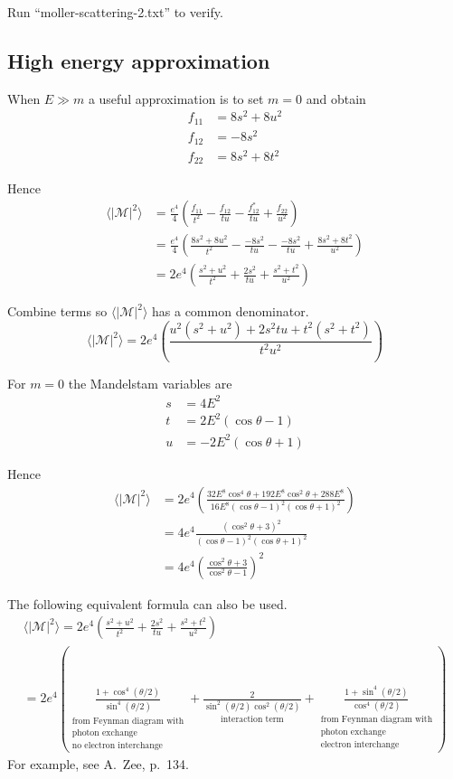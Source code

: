\documentclass[12pt]{article}
\begin{document}
\noindent
Run ``moller-scattering-2.txt'' to verify.

\subsection*{High energy approximation}
When $E\gg m$ a useful approximation is to set $m=0$ and obtain
\begin{align*}
f_{11}&=8s^2+8u^2\\
f_{12}&=-8s^2\\
f_{22}&=8s^2+8t^2
\end{align*}

\noindent
Hence
\begin{align*}
\langle|\mathcal{M}|^2\rangle
&=\frac{e^4}{4}
\left(
\frac{f_{11}}{t^2}-\frac{f_{12}}{tu}-\frac{f_{12}^*}{tu}+\frac{f_{22}}{u^2}
\right)
\\
&=\frac{e^4}{4}
\left(
\frac{8s^2+8u^2}{t^2}-\frac{-8s^2}{tu}-\frac{-8s^2}{tu}+\frac{8s^2+8t^2}{u^2}
\right)
\\
&=2e^4
\left(
\frac{s^2+u^2}{t^2}+\frac{2s^2}{tu}+\frac{s^2+t^2}{u^2}
\right)
\end{align*}

\noindent
Combine terms so $\langle|\mathcal{M}|^2\rangle$ has a common denominator.
\begin{equation*}
\langle|\mathcal{M}|^2\rangle
=2e^4
\left(
\frac{u^2(s^2+u^2)+2s^2tu+t^2(s^2+t^2)}{t^2u^2}
\right)
\end{equation*}

\noindent
For $m=0$ the Mandelstam variables are
\begin{align*}
s&=4E^2
\\
t&=2E^2(\cos\theta-1)
\\
u&=-2E^2(\cos\theta+1)
\end{align*}

\noindent
Hence
\begin{align*}
\langle|\mathcal{M}|^2\rangle
&=2e^4
\left(
\frac{32E^8\cos^4\theta+192E^8\cos^2\theta+288E^8}{16E^8(\cos\theta-1)^2(\cos\theta+1)^2}
\right)
\\
&=4e^4\frac{\left(\cos^2\theta+3\right)^2}{(\cos\theta-1)^2(\cos\theta+1)^2}
\\
&=4e^4
\left(
\frac{\cos^2\theta+3}{\cos^2\theta-1}
\right)^2
\end{align*}

\noindent
The following equivalent formula can also be used.
\begin{multline*}
\langle|\mathcal{M}|^2\rangle
=2e^4
\left(
\frac{s^2+u^2}{t^2}+\frac{2s^2}{tu}+\frac{s^2+t^2}{u^2}
\right)
\\
=2e^4\left(
\underset{\substack{\text{from Feynman diagram with}\\ \text{photon exchange}\\ \text{no electron interchange}}}
{\frac{1+\cos^4(\theta/2)}{\sin^4(\theta/2)}}+
\underset{\text{interaction term}}{\frac{2}{\sin^2(\theta/2)\cos^2(\theta/2)}}+
\underset{\substack{\text{from Feynman diagram with}\\ \text{photon exchange}\\ \text{electron interchange}}}
{\frac{1+\sin^4(\theta/2)}{\cos^4(\theta/2)}}
\right)
\end{multline*}
For example, see A.~Zee, p.~134.
\end{document}

